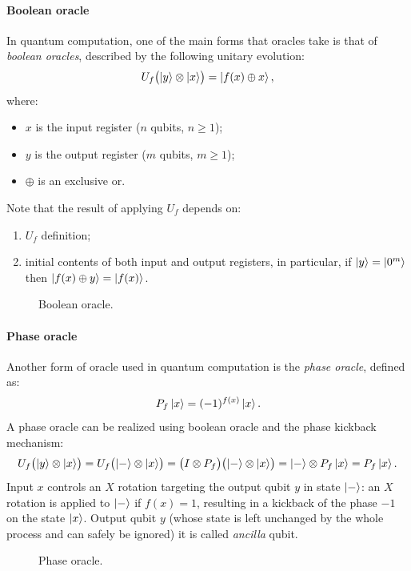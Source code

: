 \documentclass{article}
\begin{document}
\paragraph{Boolean oracle}
In quantum computation, one of the main forms that oracles take is that of
\emph{boolean oracles}, described by the following unitary evolution:
\[
  U_f \bigl( \ket{y} \otimes \ket{x} \bigr) =  \ket{f(x) \oplus x},
\]
where:
\begin{itemize}
  \item
  $x$ is the input register ($n$ qubits, $n \geq 1$);
  \item
  $y$ is the output register ($m$ qubits, $m \geq 1$);
  \item
  $\oplus$ is an exclusive or.
\end{itemize}
Note that the result of applying $U_f$ depends on:
\begin{enumerate}
  \item
  $U_f$ definition;
  \item
  initial contents of both input and output registers, in particular,
  if $\ket{y} = \ket{0^m}$ then $\ket{f(x) \oplus y} = \ket{f(x)}$.
\end{enumerate}
\begin{figure}[H]
  \centering
  
  \caption{Boolean oracle.}
\end{figure}

\paragraph{Phase oracle}
Another form of oracle used in quantum computation is the \emph{phase oracle},
defined as:
\[
  P_f \ket{x} = (-1)^{f(x)} \ket{x}.
\]
A phase oracle can be realized using boolean oracle and the phase kickback
mechanism:
\[
  U_f \bigl( \ket{y} \otimes \ket{x} \bigr)
  = U_f \bigl( \ket{-} \otimes \ket{x} \bigr)
  = \bigl( I \otimes  P_f \bigr) \bigl( \ket{-} \otimes \ket{x} \bigr)
  = \ket{-} \otimes P_f \ket{x}
  = P_f \ket{x}.
\]
Input $x$ controls an $X$ rotation targeting the output qubit $y$ in state
$\ket{-}$:
an $X$ rotation is applied to $\ket{-}$ if $f(x) = 1$, resulting in a kickback
of the phase $-1$ on the state $\ket{x}$.
Output qubit $y$ (whose state is left unchanged by the whole
process and can safely be ignored) it is called \emph{ancilla} qubit.
\begin{figure}[H]
  \centering
  
  \caption{Phase oracle.}
\end{figure}
\end{document}
